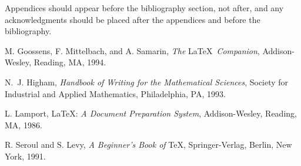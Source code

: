 \documentclass[final,leqno,onefignum,onetabnum]{siamltex1213}
\begin{document}
 
Appendices should appear before the bibliography section, not after,
and any acknowledgments should be placed after the appendices and before
the bibliography. 

\begin{thebibliography}{1}
 {\sc M. Goossens, F. Mittelbach, and A. Samarin},
{\em The} \LaTeX\ {\em Companion}, Addison-Wesley, Reading, MA, 1994.

 {\sc N.~J. Higham}, {\em Handbook of Writing for
the Mathematical Sciences}, Society for Industrial and Applied
Mathematics, Philadelphia, PA, 1993.

 {\sc L. Lamport}, \LaTeX: {\em A Document
Preparation System}, Addison-Wesley, Reading, MA, 1986.

 {\sc R. Seroul and S. Levy}, {\em A
Beginner's Book of} \TeX, Springer-Verlag, Berlin, New
York, 1991.
\end{thebibliography}
\end{document}
